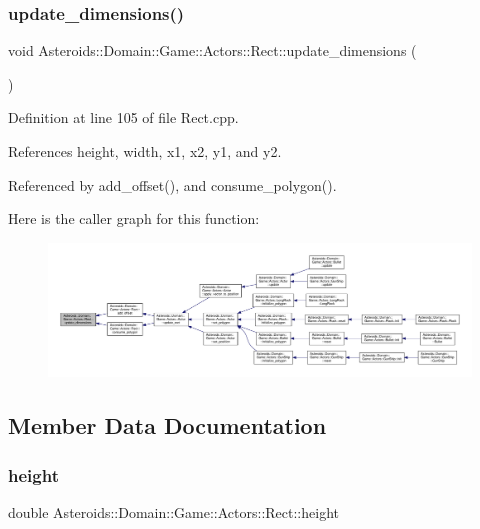 \subsubsection{\texorpdfstring{update\+\_\+dimensions()}{update\_dimensions()}}
{\footnotesize\ttfamily void Asteroids\+::\+Domain\+::\+Game\+::\+Actors\+::\+Rect\+::update\+\_\+dimensions (\begin{DoxyParamCaption}{ }\end{DoxyParamCaption})}



Definition at line 105 of file Rect.\+cpp.



References height, width, x1, x2, y1, and y2.



Referenced by add\+\_\+offset(), and consume\+\_\+polygon().

Here is the caller graph for this function\+:\nopagebreak
\begin{figure}[H]
\begin{center}
\leavevmode
\includegraphics[width=350pt]{classAsteroids_1_1Domain_1_1Game_1_1Actors_1_1Rect_a40c593b8be9c243d6cdc30e2f8ee67df_icgraph}
\end{center}
\end{figure}


\subsection{Member Data Documentation}
\mbox{\label{classAsteroids_1_1Domain_1_1Game_1_1Actors_1_1Rect_a60cb0fe29e20d550b38e93c50c160702}} 
\subsubsection{\texorpdfstring{height}{height}}
{\footnotesize\ttfamily double Asteroids\+::\+Domain\+::\+Game\+::\+Actors\+::\+Rect\+::height}



